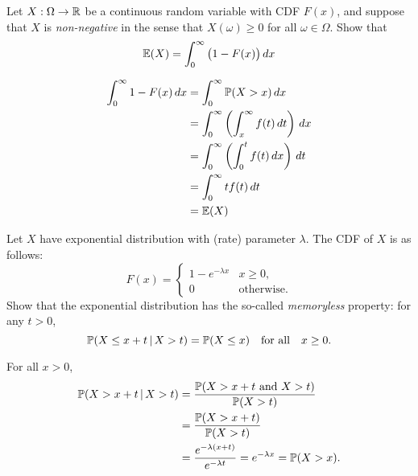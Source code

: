 \begin{exercise}
\begin{questions}
\question
Let $X:\Omega\to\mathbb{R} $ be a continuous random variable with CDF $F(x)$, and suppose that $X$ is \emph{non-negative} in the sense that $X(\omega)\geq 0$ for all $\omega\in\Omega$. Show that 
\[
\mathbb{E}(X) = \int_{0}^{\infty}\big(1-F(x)\big)\,dx
\]
\begin{answer}
\begin{align*}
\int_0^\infty 1 - F(x) \,dx 
	& = \int_{0}^{\infty} \mathbb{P}(X > x)\,dx \\
	& = \int_{0}^{\infty}\left(\int_{x}^{\infty} f(t)\,dt\right)\,dx \\
	& = \int_{0}^{\infty}\left(\int_{0}^{t} f(t)\,dx\right)\,dt \\
	& = \int_{0}^{\infty} t f(t)\,dt \\
	& = \mathbb{E}(X)
\end{align*}
\end{answer}

\question 
Let $X$ have exponential distribution with (rate) parameter $\lambda$. The CDF of $X$ is as follows:
\[
F(x) = \begin{cases}
	1 - e^{-\lambda x}	& x \geq 0, \\
	0					& \text{otherwise.}
\end{cases}
\]
Show that the exponential distribution has the so-called \emph{memoryless} property: for any $t>0$,
\[
\mathbb{P}(X\leq x + t\,|\,X > t) = \mathbb{P}(X \leq x)\quad\text{for all}\quad x\geq 0.
\]
\begin{answer}
For all $x>0$,
\begin{align*}
\mathbb{P}(X > x + t\,|\, X > t)
	& =  \frac{\mathbb{P}(X > x + t\text{ and } X > t)}{\mathbb{P}(X > t)} \\
	& =  \frac{\mathbb{P}(X > x + t)}{\mathbb{P}(X > t)} \\
	& =  \frac{e^{-\lambda(x + t)}}{e^{-\lambda t}} =  e^{-\lambda x} = \mathbb{P}(X > x).
\end{align*}
\end{answer}



\end{questions}
\end{exercise}
